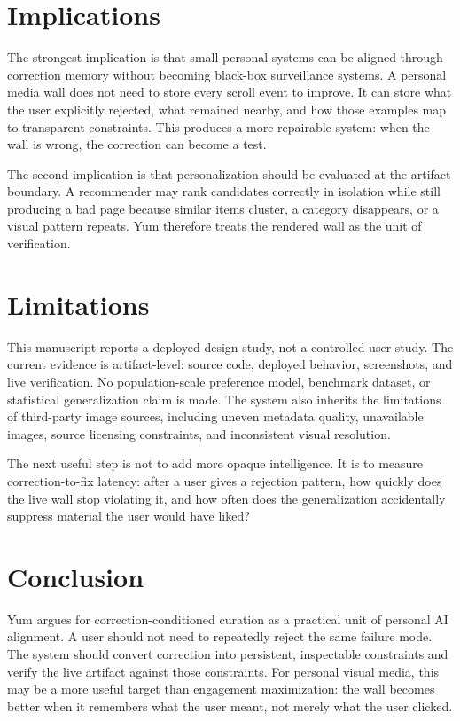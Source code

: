 \documentclass[12pt,letterpaper]{article}
\begin{document}
\section{Implications}

The strongest implication is that small personal systems can be aligned through correction memory without becoming black-box surveillance systems. A personal media wall does not need to store every scroll event to improve. It can store what the user explicitly rejected, what remained nearby, and how those examples map to transparent constraints. This produces a more repairable system: when the wall is wrong, the correction can become a test.

The second implication is that personalization should be evaluated at the artifact boundary. A recommender may rank candidates correctly in isolation while still producing a bad page because similar items cluster, a category disappears, or a visual pattern repeats. Yum therefore treats the rendered wall as the unit of verification.

\section{Limitations}

This manuscript reports a deployed design study, not a controlled user study. The current evidence is artifact-level: source code, deployed behavior, screenshots, and live verification. No population-scale preference model, benchmark dataset, or statistical generalization claim is made. The system also inherits the limitations of third-party image sources, including uneven metadata quality, unavailable images, source licensing constraints, and inconsistent visual resolution.

The next useful step is not to add more opaque intelligence. It is to measure correction-to-fix latency: after a user gives a rejection pattern, how quickly does the live wall stop violating it, and how often does the generalization accidentally suppress material the user would have liked?

\section{Conclusion}

Yum argues for correction-conditioned curation as a practical unit of personal AI alignment. A user should not need to repeatedly reject the same failure mode. The system should convert correction into persistent, inspectable constraints and verify the live artifact against those constraints. For personal visual media, this may be a more useful target than engagement maximization: the wall becomes better when it remembers what the user meant, not merely what the user clicked.
\end{document}
